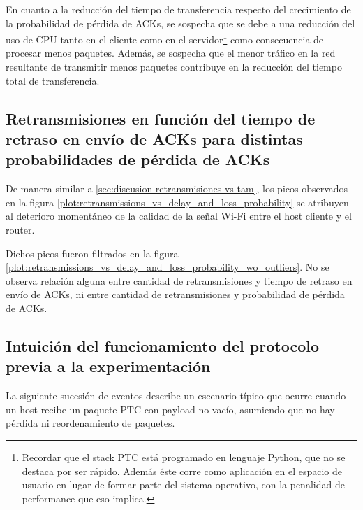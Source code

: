 \documentclass[a4paper, 10pt, twoside]{article}
\begin{document}
En cuanto a la reducción del tiempo de transferencia respecto del crecimiento de la probabilidad de pérdida de ACKs, se sospecha que se debe a una reducción del uso de CPU tanto en el cliente como en el servidor\footnote{Recordar que el stack PTC está programado en lenguaje Python, que no se destaca por ser rápido. Además éste corre como aplicación en el espacio de usuario en lugar de formar parte del sistema operativo, con la penalidad de performance que eso implica.} como consecuencia de procesar menos paquetes. Además, se sospecha que el menor tráfico en la red resultante de transmitir menos paquetes contribuye en la reducción del tiempo total de transferencia.


\subsection{Retransmisiones en función del tiempo de retraso en envío de ACKs para distintas probabilidades de pérdida de ACKs}

De manera similar a \ref{sec:discusion-retransmisiones-vs-tam}, los picos observados en la figura \ref{plot:retransmissions_vs_delay_and_loss_probability} se atribuyen al deterioro momentáneo de la calidad de la señal Wi-Fi entre el host cliente y el router.

Dichos picos fueron filtrados en la figura \ref{plot:retransmissions_vs_delay_and_loss_probability_wo_outliers}. No se observa relación alguna entre cantidad de retransmisiones y tiempo de retraso en envío de ACKs, ni entre cantidad de retransmisiones y probabilidad de pérdida de ACKs.


\subsection{Intuición del funcionamiento del protocolo previa a la experimentación}
\label{sec:discusion-intuicion}

La siguiente sucesión de eventos describe un escenario típico que ocurre cuando un host recibe un paquete PTC con payload no vacío, asumiendo que no hay pérdida ni reordenamiento de paquetes.
\end{document}
